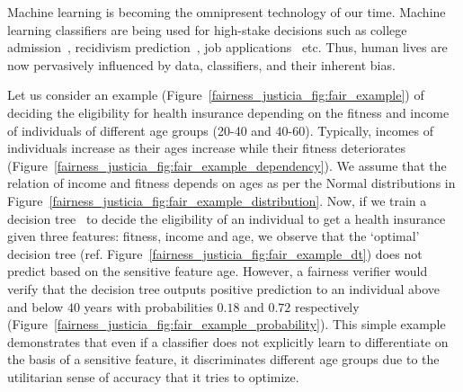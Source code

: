 \label{chapter:justicia}
Machine learning is becoming the omnipresent technology of our time. Machine learning classifiers are being used for high-stake decisions such as college admission~\cite{martinez2021using}, recidivism prediction~\cite{tollenaar2013method}, job applications~\cite{ajunwa2016hiring} etc. Thus, human lives are now pervasively influenced by data, classifiers, and their inherent bias.

\begin{example}\label{fairness_justicia_example:intro}
\normalfont
Let us consider an example (Figure~\ref{fairness_justicia_fig:fair_example}) of deciding the eligibility for health insurance depending on the fitness and income of individuals of different age groups (20-40 and 40-60). Typically, incomes of individuals increase as their ages increase while their fitness deteriorates (Figure~\ref{fairness_justicia_fig:fair_example_dependency}). We assume that the relation of income and fitness depends on ages as per the Normal distributions in Figure~\ref{fairness_justicia_fig:fair_example_distribution}. Now, if we train a decision tree~\cite{narodytska2018learning} to decide the eligibility of an individual to get a health insurance given three features: fitness, income and age, we observe that the `optimal' decision tree (ref. Figure~\ref{fairness_justicia_fig:fair_example_dt}) does not predict based on the sensitive feature age. However, a fairness verifier would verify that the decision tree outputs positive prediction to an individual above and below $40$ years with probabilities $0.18$ and $0.72$ respectively (Figure~\ref{fairness_justicia_fig:fair_example_probability}). This simple example demonstrates that even if a classifier does not explicitly learn to differentiate on the basis of a sensitive feature, it discriminates different age groups due to the utilitarian sense of accuracy that it tries to optimize.
\end{example}

